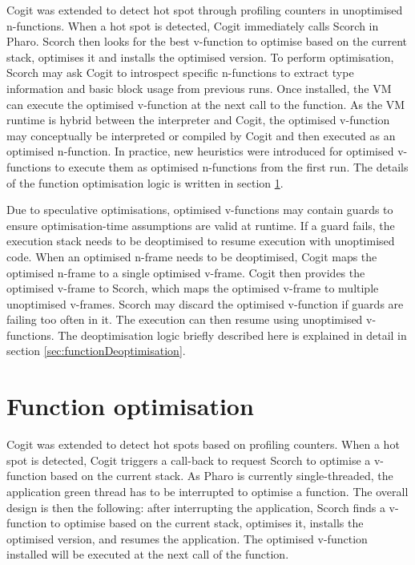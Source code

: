 \documentclass[a4paper,12pt,twoside]{../includes/ThesisStyle}
\begin{document}
Cogit was extended to detect hot spot through profiling counters in unoptimised n-functions. When a hot spot is detected, Cogit immediately calls Scorch in Pharo. Scorch then looks for the best v-function to optimise based on the current stack, optimises it and installs the optimised version. To perform optimisation, Scorch may ask Cogit to introspect specific n-functions to extract type information and basic block usage from previous runs. Once installed, the VM can execute the optimised v-function at the next call to the function. As the VM runtime is hybrid between the interpreter and Cogit, the optimised v-function may conceptually be interpreted or compiled by Cogit and then executed as an optimised n-function. In practice, new heuristics were introduced for optimised v-functions to execute them as optimised n-functions from the first run. The details of the function optimisation logic is written in section \ref{sec:functionOptimisation}.

Due to speculative optimisations, optimised v-functions may contain guards to ensure optimisation-time assumptions are valid at runtime. If a guard fails, the execution stack needs to be deoptimised to resume execution with unoptimised code. When an optimised n-frame needs to be deoptimised, Cogit maps the optimised n-frame to a single optimised v-frame. Cogit then provides the optimised v-frame to Scorch, which maps the optimised v-frame to multiple unoptimised v-frames. Scorch may discard the optimised v-function if guards are failing too often in it. The execution can then resume using unoptimised v-functions. The deoptimisation logic briefly described here is explained in detail in section \ref{sec:functionDeoptimisation}.


\section{Function optimisation}
\label{sec:functionOptimisation}

Cogit was extended to detect hot spots based on profiling counters. When a hot spot is detected, Cogit triggers a call-back to request Scorch to optimise a v-function based on the current stack. As Pharo is currently single-threaded, the application green thread has to be interrupted to optimise a function. The overall design is then the following: after interrupting the application, Scorch finds a v-function to optimise based on the current stack, optimises it, installs the optimised version, and resumes the application. The optimised v-function installed will be executed at the next call of the function.
\end{document}
